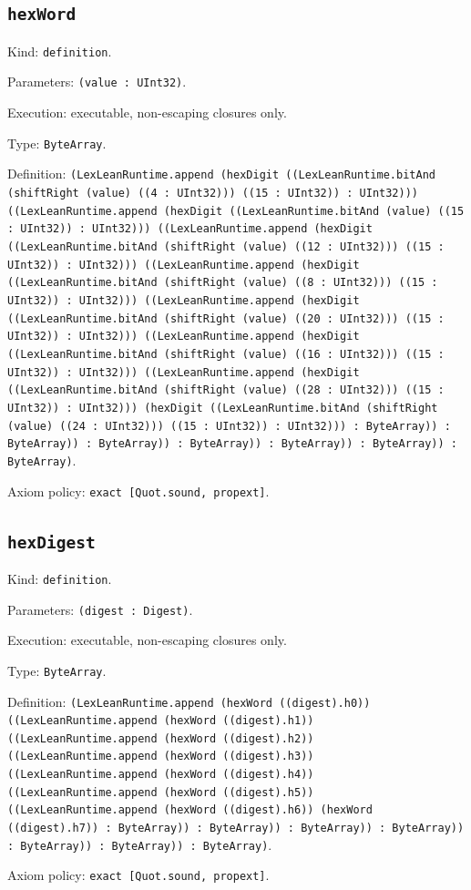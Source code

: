\documentclass[11pt]{article}
\begin{document}
\subsection*{\texttt{hexWord}}
\noindent Kind: \texttt{definition}.\par
\noindent Parameters: \texttt{(value : UInt32)}.\par
\noindent Execution: executable, non-escaping closures only.\par
\noindent Type: \texttt{ByteArray}.\par
\noindent Definition: \texttt{(LexLeanRuntime.append (hexDigit ((LexLeanRuntime.bitAnd (shiftRight (value) ((4 : UInt32))) ((15 : UInt32)) : UInt32))) ((LexLeanRuntime.append (hexDigit ((LexLeanRuntime.bitAnd (value) ((15 : UInt32)) : UInt32))) ((LexLeanRuntime.append (hexDigit ((LexLeanRuntime.bitAnd (shiftRight (value) ((12 : UInt32))) ((15 : UInt32)) : UInt32))) ((LexLeanRuntime.append (hexDigit ((LexLeanRuntime.bitAnd (shiftRight (value) ((8 : UInt32))) ((15 : UInt32)) : UInt32))) ((LexLeanRuntime.append (hexDigit ((LexLeanRuntime.bitAnd (shiftRight (value) ((20 : UInt32))) ((15 : UInt32)) : UInt32))) ((LexLeanRuntime.append (hexDigit ((LexLeanRuntime.bitAnd (shiftRight (value) ((16 : UInt32))) ((15 : UInt32)) : UInt32))) ((LexLeanRuntime.append (hexDigit ((LexLeanRuntime.bitAnd (shiftRight (value) ((28 : UInt32))) ((15 : UInt32)) : UInt32))) (hexDigit ((LexLeanRuntime.bitAnd (shiftRight (value) ((24 : UInt32))) ((15 : UInt32)) : UInt32))) : ByteArray)) : ByteArray)) : ByteArray)) : ByteArray)) : ByteArray)) : ByteArray)) : ByteArray)}.\par
\noindent Axiom policy: \texttt{exact [Quot.sound, propext]}.\par
\subsection*{\texttt{hexDigest}}
\noindent Kind: \texttt{definition}.\par
\noindent Parameters: \texttt{(digest : Digest)}.\par
\noindent Execution: executable, non-escaping closures only.\par
\noindent Type: \texttt{ByteArray}.\par
\noindent Definition: \texttt{(LexLeanRuntime.append (hexWord ((digest).h0)) ((LexLeanRuntime.append (hexWord ((digest).h1)) ((LexLeanRuntime.append (hexWord ((digest).h2)) ((LexLeanRuntime.append (hexWord ((digest).h3)) ((LexLeanRuntime.append (hexWord ((digest).h4)) ((LexLeanRuntime.append (hexWord ((digest).h5)) ((LexLeanRuntime.append (hexWord ((digest).h6)) (hexWord ((digest).h7)) : ByteArray)) : ByteArray)) : ByteArray)) : ByteArray)) : ByteArray)) : ByteArray)) : ByteArray)}.\par
\noindent Axiom policy: \texttt{exact [Quot.sound, propext]}.\par
\end{document}
